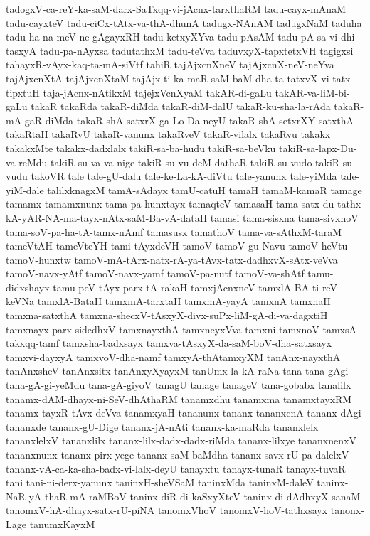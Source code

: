 {tadogxV-ca-reY-ka-saM-darx-SaTxqq-vi-jAcnx-tarxthaRM
tadu-cayx-mAnaM
tadu-cayxteV
tadu-ciCx-tAtx-va-thA-dhunA
tadugx-NAnAM
tadugxNaM
taduha
tadu-ha-na-meV-ne-gAgayxRH
tadu-ketxyXYva
tadu-pAsAM
tadu-pA-sa-vi-dhi-tasxyA
tadu-pa-nAyxsa
tadutathxM
tadu-teVva
taduvxyX-tapxtetxVH
tagigxsi
tahayxR-vAyx-kaq-ta-mA-siVtf
tahiR
tajAjxcnXneV
tajAjxcnX-neV-neYva
tajAjxcnXtA
tajAjxcnXtaM
tajAjx-ti-ka-maR-saM-baM-dha-ta-tatxvX-vi-tatx-tipxtuH
taja-jAcnx-nAtikxM
tajejxVcnXyaM
takAR-di-gaLu
takAR-va-liM-bi-gaLu
takaR
takaRda
takaR-diMda
takaR-diM-dalU
takaR-ku-sha-la-rAda
takaR-mA-gaR-diMda
takaR-shA-satxrX-ga-Lo-Da-neyU
takaR-shA-setxrXY-satxthA
takaRtaH
takaRvU
takaR-vanunx
takaRveV
takaR-vilalx
takaRvu
takakx
takakxMte
takakx-dadxlalx
takiR-sa-ba-hudu
takiR-sa-beVku
takiR-sa-lapx-Du-va-reMdu
takiR-su-va-va-nige
takiR-su-vu-deM-dathaR
takiR-su-vudo
takiR-su-vudu
takoVR
tale
tale-gU-dalu
tale-ke-La-kA-diVtu
tale-yanunx
tale-yiMda
tale-yiM-dale
talilxknagxM
tamA-sAdayx
tamU-catuH
tamaH
tamaM-kamaR
tamage
tamamx
tamamxnunx
tama-pa-hunxtayx
tamaqteV
tamasaH
tama-satx-du-tathx-kA-yAR-NA-ma-tayx-nAtx-saM-Ba-vA-dataH
tamasi
tama-sisxna
tama-sivxnoV
tama-soV-pa-ha-tA-tamx-nAmf
tamasusx
tamathoV
tama-va-sAthxM-taraM
tameVtAH
tameVteYH
tami-tAyxdeVH
tamoV
tamoV-gu-Navu
tamoV-heVtu
tamoV-hunxtw
tamoV-mA-tArx-natx-rA-ya-tAvx-tatx-dadhxvX-sAtx-veVva
tamoV-navx-yAtf
tamoV-navx-yamf
tamoV-pa-nutf
tamoV-va-shAtf
tamu-didxshayx
tamu-peV-tAyx-parx-tA-rakaH
tamxjAcnxneV
tamxlA-BA-ti-reV-keVNa
tamxlA-BataH
tamxmA-tarxtaH
tamxmA-yayA
tamxnA
tamxnaH
tamxna-satxthA
tamxna-shecxV-tAsxyX-divx-suPx-liM-gA-di-va-dagxtiH
tamxnayx-parx-sidedhxV
tamxnayxthA
tamxneyxVva
tamxni
tamxnoV
tamxsA-takxqq-tamf
tamxsha-badxsayx
tamxva-tAsxyX-da-saM-boV-dha-satxsayx
tamxvi-dayxyA
tamxvoV-dha-namf
tamxyA-thAtamxyXM
tanAnx-nayxthA
tanAnxsheV
tanAnxsitx
tanAnxyXyayxM
tanUmx-la-kA-raNa
tana
tana-gAgi
tana-gA-gi-yeMdu
tana-gA-giyoV
tanagU
tanage
tanageV
tana-gobabx
tanalilx
tanamx-dAM-dhayx-ni-SeV-dhAthaRM
tanamxdhu
tanamxma
tanamxtayxRM
tanamx-tayxR-tAvx-deVva
tanamxyaH
tananunx
tananx
tananxcnA
tananx-dAgi
tananxde
tananx-gU-Dige
tananx-jA-nAti
tananx-ka-maRda
tananxlelx
tananxlelxV
tananxlilx
tananx-lilx-dadx-dadx-riMda
tananx-lilxye
tananxnenxV
tananxnunx
tananx-pirx-yege
tananx-saM-baMdha
tananx-savx-rU-pa-dalelxV
tananx-vA-ca-ka-sha-badx-vi-lalx-deyU
tanayxtu
tanayx-tunaR
tanayx-tuvaR
tani
tani-ni-derx-yanunx
taninxH-sheVSaM
taninxMda
taninxM-daleV
taninx-NaR-yA-thaR-mA-raMBoV
taninx-diR-di-kaSxyXteV
taninx-di-dAdhxyX-sanaM
tanomxV-hA-dhayx-satx-rU-piNA
tanomxVhoV
tanomxV-hoV-tathxsayx
tanonx-Lage
tanumxKayxM
}
